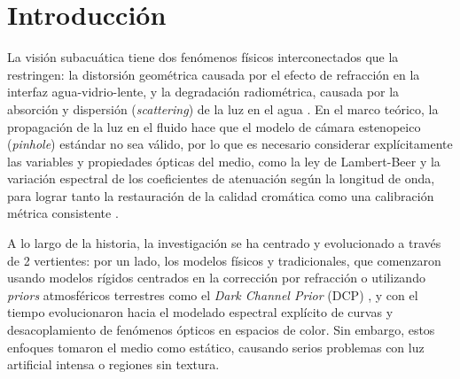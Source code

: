\documentclass[12pt,letterpaper,spanish,twoside,openright]{report}
\begin{document}
\chapter{Introducción}

La visión subacuática tiene dos fenómenos físicos interconectados que la restringen: la distorsión geométrica causada por el efecto de refracción en la interfaz agua-vidrio-lente, y la degradación radiométrica, causada por la absorción y dispersión (\textit{scattering}) de la luz en el agua \parencite{calZhang, 11176009}. En el marco teórico, la propagación de la luz en el fluido hace que el modelo de cámara estenopeico (\textit{pinhole}) estándar no sea válido, por lo que es necesario considerar explícitamente las variables y propiedades ópticas del medio, como la ley de Lambert-Beer y la variación espectral de los coeficientes de atenuación según la longitud de onda, para lograr tanto la restauración de la calidad cromática como una calibración métrica consistente \parencite{10216333, rs15194699}.

A lo largo de la historia, la investigación se ha centrado y evolucionado a través de 2 vertientes: por un lado, los modelos físicos y tradicionales, que comenzaron usando modelos rígidos centrados en la corrección por refracción \parencite{calZhang} o utilizando \textit{priors} atmosféricos terrestres como el \textit{Dark Channel Prior} (DCP) \parencite{rs15194699, Ke_2023}, y con el tiempo evolucionaron hacia el modelado espectral explícito de curvas y desacoplamiento de fenómenos ópticos en espacios de color. Sin embargo, estos enfoques tomaron el medio como estático, causando serios problemas con luz artificial intensa o regiones sin textura.
\end{document}
